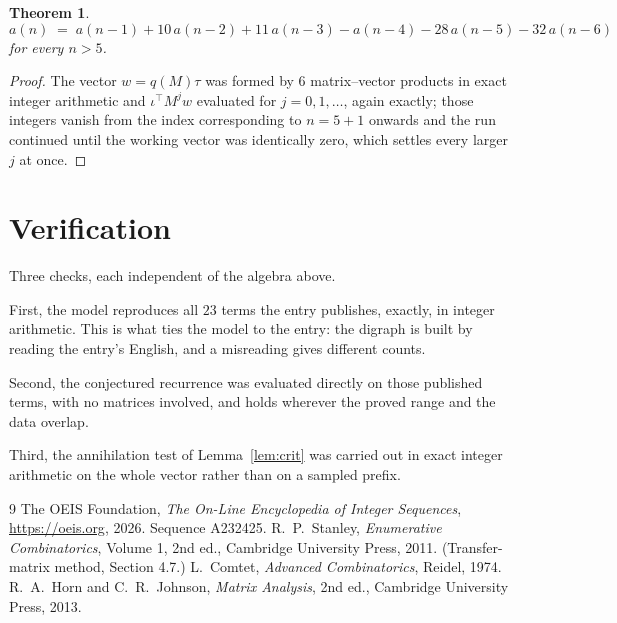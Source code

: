 \documentclass[11pt,a4paper]{article}
\theoremstyle{plain}
\newtheorem{theorem}{Theorem}
\theoremstyle{definition}
\begin{document}
\begin{theorem}
\[
a(n)\;=\;a(n-1) + 10\,a(n-2) + 11\,a(n-3) - a(n-4) - 28\,a(n-5) - 32\,a(n-6)
\]
for every $n>5$.
\end{theorem}

\begin{proof}
The vector $w=q(M)\tau$ was formed by $6$ matrix--vector products in exact integer
arithmetic and $\iota^{\!\top}M^{j}w$ evaluated for $j=0,1,\dots$, again exactly; those
integers vanish from the index corresponding to $n=5+1$ onwards and the run continued
until the working vector was identically zero, which settles every larger $j$ at once.
\end{proof}

\section{Verification}

Three checks, each independent of the algebra above.

First, the model reproduces all $23$ terms the entry publishes, exactly, in integer
arithmetic. This is what ties the model to the entry: the digraph is built by reading the
entry's English, and a misreading gives different counts.

Second, the conjectured recurrence was evaluated directly on those published terms, with no
matrices involved, and holds wherever the proved range and the data overlap.

Third, the annihilation test of Lemma~\ref{lem:crit} was carried out in exact integer
arithmetic on the whole vector rather than on a sampled prefix.

\begin{thebibliography}{9}
 The OEIS Foundation, \emph{The On-Line Encyclopedia of Integer
Sequences}, \url{https://oeis.org}, 2026. Sequence A232425.
 R.~P.~Stanley, \emph{Enumerative Combinatorics}, Volume 1, 2nd ed.,
Cambridge University Press, 2011. (Transfer-matrix method, Section 4.7.)
 L.~Comtet, \emph{Advanced Combinatorics}, Reidel, 1974.
 R.~A.~Horn and C.~R.~Johnson, \emph{Matrix Analysis}, 2nd ed., Cambridge
University Press, 2013.
\end{thebibliography}
\end{document}
